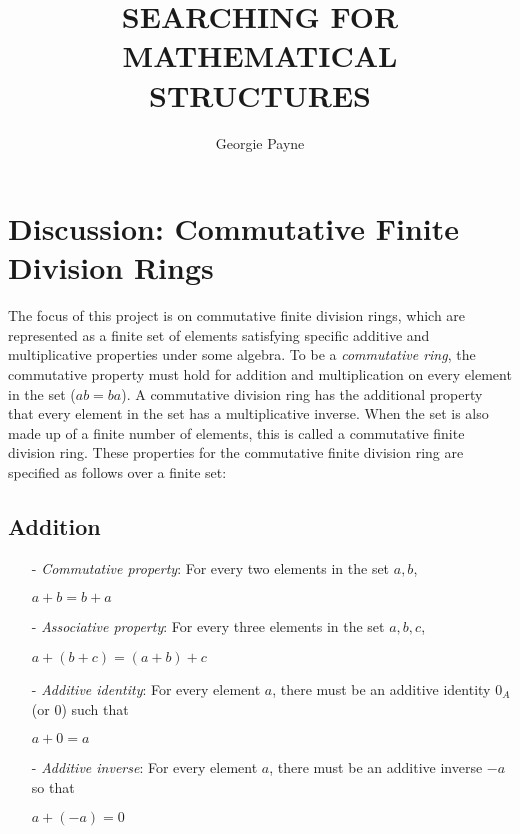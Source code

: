 \documentclass{article}
\title{SEARCHING FOR MATHEMATICAL STRUCTURES}
\author{Georgie Payne}
\date{}
\begin{document}
\maketitle

\section{Discussion: Commutative Finite Division Rings}
The focus of this project is on commutative finite division rings, which are represented as a finite set of elements satisfying specific additive and multiplicative properties under some algebra. To be a \textit{commutative ring}, the commutative property must hold for addition and multiplication on every element in the set ($ab=ba$). A commutative division ring has the additional property that every element in the set has a multiplicative inverse. When the set is also made up of a finite number of elements, this is called a commutative finite division ring. These properties for the commutative finite division ring are specified as follows over a finite set:

\subsection{Addition}
\begin{itemize}
    \item[-] \textit{Commutative property}: For every two elements in the set $a, b$,
    \begin{center}
        $a + b = b + a$
    \end{center} 
    
    \item[-] \textit{Associative property}: For every three elements in the set $a, b, c$,
    \begin{center}
        $a + (b + c) = (a + b) +c$
    \end{center}

    \item[-] \textit{Additive identity}: For every element $a$, there must be an additive identity $0_A$ (or 0) such that
    \begin{center}
        $a + 0 = a$
    \end{center}

    \item[-] \textit{Additive inverse}: For every element $a$, there must be an additive inverse $-a$ so that
    \begin{center}
        $a + (-a) = 0$
    \end{center}
\end{itemize}
\end{document}

